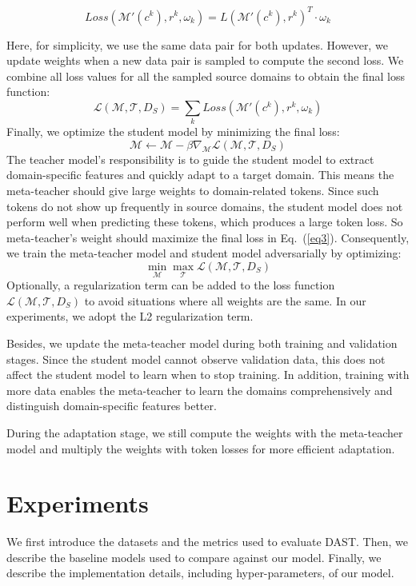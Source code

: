 \documentclass[letterpaper]{article} %
\begin{document}
$$Loss(\mathcal{M'}(c^k),{r}^k,\omega_k)={\mathit{L}(\mathcal{M'}(c^k),{r}^k)}^T\cdot \omega_k$$

Here, for simplicity, we use the same data pair for both updates. However, we update weights when a new data pair is sampled to compute the second loss.
We combine all loss values for all the sampled source domains to obtain the final loss function:
\begin{equation}\label{eq3}
\mathscr{L}(\mathcal{M},\mathcal{T}, D_S)=\sum_k \mathit{Loss}(\mathcal{M}'( c^k), {r}^k, \omega_k)
\end{equation}
Finally, we optimize the student model by minimizing the final loss:
$$\mathcal{M} \leftarrow \mathcal{M} - \beta \nabla_{\mathcal{M}} \mathscr{L}(\mathcal{M},\mathcal{T}, D_S)$$
The teacher model's responsibility is to guide the student model to extract domain-specific features and quickly adapt to a target domain.
This means the meta-teacher should give large weights to domain-related tokens. Since such tokens do not show up frequently in source domains, the student model does not perform well when predicting these tokens, which produces a large token loss.
So meta-teacher's weight should maximize the final loss in Eq.~(\ref{eq3}).
Consequently, we train the meta-teacher model and student model adversarially by optimizing:
$$\min_{\mathcal{M}}\max_{\mathcal{T}}\mathscr{L}(\mathcal{M},\mathcal{T}, D_S)$$
Optionally, a regularization term can be added to the loss function $\mathscr{L}(\mathcal{M},\mathcal{T}, D_S)$ to avoid situations where all weights are the same. In our experiments, we adopt the L2 regularization term.

Besides, we update the meta-teacher model during both training and validation stages. Since the student model cannot observe validation data, this does not affect the student model to learn when to stop training. In addition, training with more data enables the meta-teacher to learn the domains comprehensively and distinguish domain-specific features better.

During the adaptation stage, we still compute the weights with the meta-teacher model and multiply the weights with token losses for more efficient adaptation.







\section*{Experiments}
We first introduce the datasets and the metrics used to evaluate DAST. Then, we describe the baseline models used to compare against our model. Finally, we describe the implementation details, including hyper-parameters, of our model.
\end{document}

